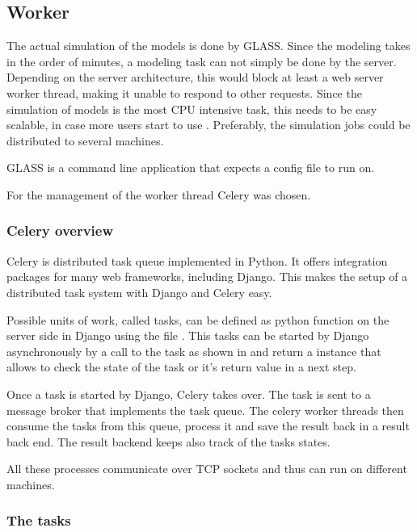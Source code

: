 \subsection{Worker}
\label{sec:worker}

The actual simulation of the models is done by GLASS.
Since the modeling takes in the order of minutes, a modeling task can not simply be done by the server.
Depending on the server architecture, this would block at least a web server worker thread, making it unable to respond to other requests.
Since the simulation of models is the most CPU intensive task, this needs to be easy scalable, in case more users start to use \spl. 
Preferably, the simulation jobs could be distributed to several machines.

GLASS is a command line application that expects a config file to run on.

For the management of the worker thread Celery was chosen.


\subsubsection{Celery overview}
Celery is distributed task queue implemented in Python.
It offers integration packages for many web frameworks, including Django.
This makes the setup of a distributed task system with Django and Celery easy.


Possible units of work, called tasks, can be defined as python function on the server side in Django using the file .
This tasks can be started by Django asynchronously by a call to the task as shown in  and return a  instance that allows to check the state of the task or it's return value in a next step.

Once a task is started by Django, Celery takes over.
The task is sent to a message broker that implements the task queue.
The celery worker threads then consume the tasks from this queue, process it and save the result back in a result back end. The result backend keeps also track of the tasks states.

All these processes communicate over TCP sockets and thus can run on different machines.

\subsubsection{The tasks}

